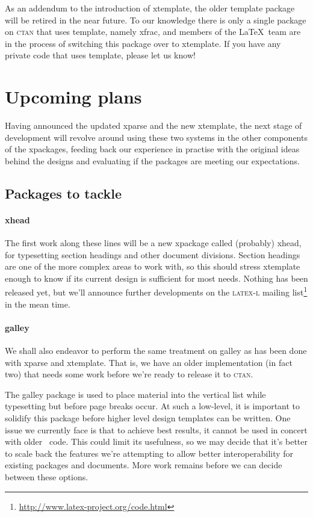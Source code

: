 \documentclass{ltnews}
\begin{document}
As an addendum to the introduction of \textsf{xtemplate}, the older \textsf{template} package will be retired in the near future. To our knowledge there is only a single package on \textsc{ctan} that uses \textsf{template}, namely \textsf{xfrac}, and members of the \LaTeX\ team are in the process of switching this package over to \textsf{xtemplate}. If you have any private code that uses \textsf{template}, please let us know!


\section{Upcoming plans}

Having announced the updated \textsf{xparse} and the new \textsf{xtemplate}, the next stage of development will revolve around using these two systems in the other components of the \textsf{xpackages}, feeding back our experience in practise with the original ideas behind the designs and evaluating if the packages are meeting our expectations.

\subsection{Packages to tackle}

\paragraph{\textsf{xhead}}
The first work along these lines will be a new \textsf{xpackage} called (probably) \textsf{xhead}, for typesetting section headings and other document divisions.
Section headings are one of the more complex areas to work with, so this should stress \textsf{xtemplate} enough to know if its current design is sufficient for most needs.
Nothing has been released yet, but we'll announce further developments on the \textsc{latex-l} mailing list\footnote{\url{http://www.latex-project.org/code.html}} in the mean time.

\paragraph{\textsf{galley}}
We shall also endeavor to perform the same treatment on \textsf{galley} as has
been done with \textsf{xparse} and \textsf{xtemplate}. That is, we have an
older implementation (in fact two) that needs some work before we're ready to release it to \textsc{ctan}.

The \textsf{galley} package is used to place material into the vertical list while typesetting but before page breaks occur. At such a low-level, it is important to solidify this package before higher level design templates can be written. One issue we currently face is that to achieve best results, it cannot be used in concert with older \LaTeXe\ code. This could limit its usefulness, so we may decide that it's better to scale back the features we're attempting to allow better interoperability for existing packages and documents. More work remains before we can decide between these options.
\end{document}
